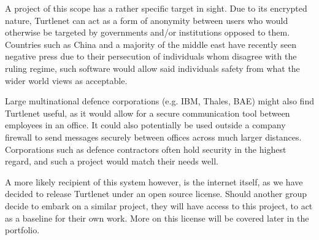A project of this scope has a rather specific target in sight. Due to its 
encrypted nature, Turtlenet can act as a form of anonymity between users who 
would otherwise be targeted by governments and/or institutions opposed to 
them. Countries such as China\cite{chinafirewall} and a majority of the middle 
east\cite{libyaEgypt} have recently seen negative press due to their 
persecution of individuals whom disagree with the ruling regime, such software 
would allow said individuals safety from what the wider world views as 
acceptable. 

Large multinational defence corporations (e.g. IBM, Thales, BAE) might also 
find Turtlenet useful, as it would allow for a secure communication tool 
between employees in an office. It could also potentially be used outside a 
company firewall to send messages securely between offices across much larger 
distances. Corporations such as defence contractors often hold security in the 
highest regard, and such a project would match their needs well.

A more likely recipient of this system however, is the internet itself, as we
have decided to release Turtlenet under an open source license. Should another 
group decide to embark on a similar project, they will have access to this 
project, to act as a baseline for their own work. More on this license will be 
covered later in the portfolio.
